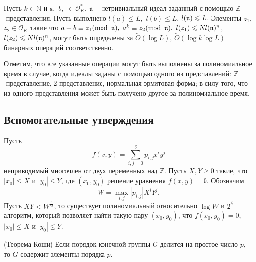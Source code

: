 \documentclass[_00_dissertation.tex]{subfiles}
\begin{document}
\begin{corollary}
    Пусть $k \in \mathbb{N}$ и $a,$ $b,$ $ \in \mathcal{O}_K^*$, $\mathfrak{n}$ -- нетривиальный идеал заданный с помощью $\mathbb{Z}$-представления. Пусть выполнено $l(a)\leq L,$ $l(b)\leq L$, $l(\mathfrak{n})\leqslant L.$ Элементы $z_1,$ $z_2\in \mathcal{O}_K$ такие что $a+b\equiv z_1(\textrm{mod }\,\mathfrak{n}),$ $a^k\equiv z_2(\textrm{mod }\,\mathfrak{n}),$ $l(z_1)\leqslant Nl(\mathfrak{n})^n$, $l(z_2)\leqslant Nl(\mathfrak{n})^n$, могут быть определены за $\tilde{O}(\log L)$, $\tilde{O}(\log k \log L)$  бинарных операций соответственно.
\end{corollary}

\begin{remark}
    Отметим, что все указанные операции могут быть выполнены за полиномиальное время в случае, когда идеалы заданы с помощью одного из представлений: $\mathbb{Z}$-представление, 2-представление, нормальная эрмитовая форма; в силу того, что из одного представления может быть получено другое за полиномиальное время.
\end{remark}

\subsection{Вспомогательные утверждения}

\begin{statement}\label{statement:coppersmith}
  Пусть
  \begin{equation*}
      f(x, y) = \sum\limits_{i, j = 0}^{\delta} p_{i, j} x^i y^j
  \end{equation*}
  неприводимый многочлен от двух переменных над $\mathbb{Z}$.
  Пусть $X, Y \ge 0$ такие, что $|x_0| \le X$ и $|y_0| \le Y$, где $(x_0, y_0)$ решение уравнения $f(x, y) = 0$.
  Обозначим
  \begin{equation*}
      W = \max_{i, j} |p_{i, j}| X^i Y^j.
  \end{equation*}
  Пусть $XY < W^{\frac{3}{2\delta}}$, то существует полиномиальный относительно $\log W$ и $2^\delta$ алгоритм, который позволяет найти такую пару $(x_0, y_0)$, что $f(x_0, y_0) = 0$, $|x_0| \le X$ и $|y_0| \le Y$.
\end{statement}

\begin{statement}\label{statement:cauchy}(Теорема Коши)
    Если порядок конечной группы $G$ делится на простое число $p$, то $G$ содержит элементы порядка $p$.
\end{statement}
\end{document}
